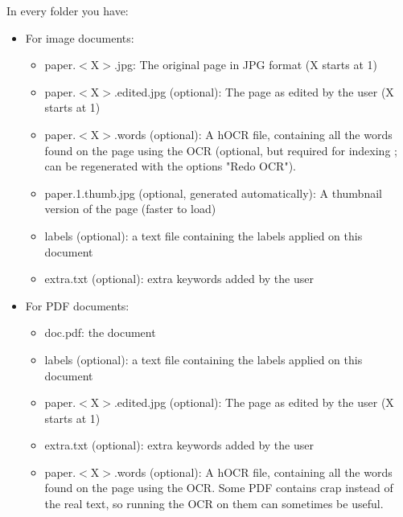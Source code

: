 \documentclass[10pt,a4paper]{article}
\begin{document}
In every folder you have:
\begin{itemize}
	\item For image documents:
	\begin{itemize}
		\item paper.$<$X$>$.jpg: The original page in JPG format (X starts at 1)
		\item paper.$<$X$>$.edited.jpg (optional): The page as edited by the user (X starts at 1)
		\item paper.$<$X$>$.words (optional): A hOCR file, containing all the words
		found on the page using the OCR (optional, but required for indexing
		; can be regenerated with the options "Redo OCR").
		\item paper.1.thumb.jpg (optional, generated automatically): A thumbnail
		version of the page (faster to load)
		\item labels (optional): a text file containing the labels applied on this document
		\item extra.txt (optional): extra keywords added by the user
	\end{itemize}

	\item For PDF documents:
	\begin{itemize}
		\item doc.pdf: the document
		\item labels (optional): a text file containing the labels applied on this document
		\item paper.$<$X$>$.edited.jpg (optional): The page as edited by the user (X starts at 1)
		\item extra.txt (optional): extra keywords added by the user
		\item paper.$<$X$>$.words (optional): A hOCR file, containing all the words
		found on the page using the OCR. Some PDF contains crap instead of
			the real text, so running the OCR on them can sometimes be useful.
	\end{itemize}
\end{itemize}
\end{document}
